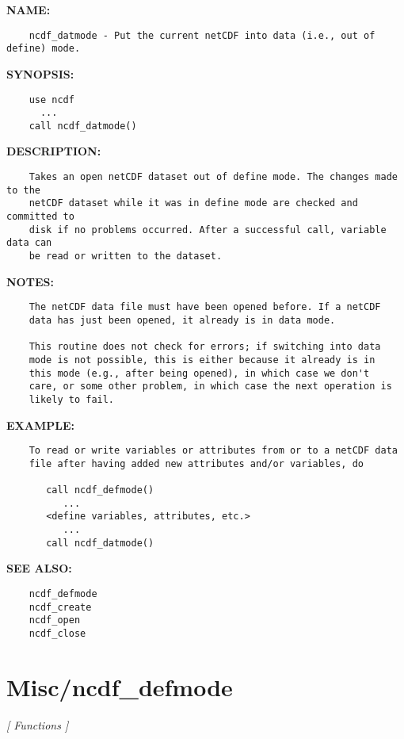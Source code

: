\label{ch:robo74}
\label{ch:Misc_ncdf_datmode}
\textbf{NAME:}\hspace{0.08in}\begin{Verbatim}
    ncdf_datmode - Put the current netCDF into data (i.e., out of define) mode.
\end{Verbatim}
\textbf{SYNOPSIS:}\hspace{0.08in}\begin{Verbatim}
    use ncdf
      ...
    call ncdf_datmode()
\end{Verbatim}
\textbf{DESCRIPTION:}\hspace{0.08in}\begin{Verbatim}
    Takes an open netCDF dataset out of define mode. The changes made to the
    netCDF dataset while it was in define mode are checked and committed to
    disk if no problems occurred. After a successful call, variable data can
    be read or written to the dataset.
\end{Verbatim}
\textbf{NOTES:}\hspace{0.08in}\begin{Verbatim}
    The netCDF data file must have been opened before. If a netCDF
    data has just been opened, it already is in data mode.

    This routine does not check for errors; if switching into data
    mode is not possible, this is either because it already is in
    this mode (e.g., after being opened), in which case we don't
    care, or some other problem, in which case the next operation is
    likely to fail.
\end{Verbatim}
\textbf{EXAMPLE:}\hspace{0.08in}\begin{Verbatim}
    To read or write variables or attributes from or to a netCDF data
    file after having added new attributes and/or variables, do

       call ncdf_defmode()
          ...
       <define variables, attributes, etc.>
          ...
       call ncdf_datmode()
\end{Verbatim}
\textbf{SEE ALSO:}\hspace{0.08in}\begin{Verbatim}
    ncdf_defmode
    ncdf_create
    ncdf_open
    ncdf_close
\end{Verbatim}
\section{Misc/ncdf\_defmode}
\textsl{[ Functions ]}

